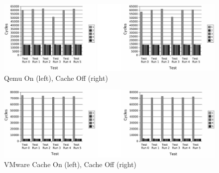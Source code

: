 \begin{figure}[!t]
	\centering
	\includegraphics[width=\textwidth]{figure/qemu.jpg}
	\caption{Qemu On (left), Cache Off (right)}
	\label{fig:cache_qemu}
\end{figure}

\begin{figure}[!t]
	\centering
	\includegraphics[width=\textwidth]{figure/vmware.jpg}
	\caption{VMware Cache On (left), Cache Off (right)}
	\label{fig:cache_vmware}
\end{figure}

